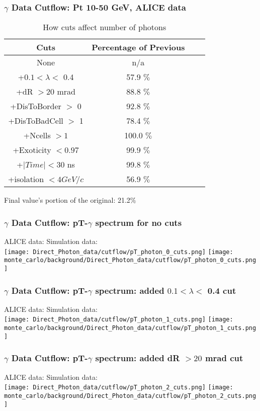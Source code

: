 \documentclass{beamer}
\begin{document}
\frame 
{ 
\frametitle{$\gamma$ Data Cutflow: Pt 10-50 GeV, ALICE data} 
\begin{table} 
\caption{How cuts affect number of photons} 
\centering 
\begin{tabular}{c c c c} 
\hline\hline 
Cuts & Percentage of Previous\\ [0.5ex] 
\hline
None & n/a\\
+$0.1 < \lambda <$ 0.4 & 57.9 $\%$ \\
+dR $> 20$ mrad & 88.8 $\%$ \\
+DisToBorder $>$ 0 & 92.8 $\%$ \\
+DisToBadCell $>$ 1 & 78.4 $\%$ \\
+Ncells $> 1$ & 100.0 $\%$ \\
+Exoticity $< 0.97$ & 99.9 $\%$ \\
+$|Time| < 30$ ns & 99.8 $\%$ \\
+isolation $< 4 GeV/c$ & 56.9 $\%$ \\
[1ex] 
\hline 
\end{tabular} 
\label{table:nonlin} 
\end{table} 
 Final value's portion of the original: 21.2\%
 } 

\frame
{
	\frametitle{$\gamma$ Data Cutflow: pT-$\gamma$ spectrum for no cuts}
	\noindent\hspace{1.5 cm}ALICE data: 
	\noindent\hspace{3.0 cm} Simulation data:\\
	\texttt{[image: Direct\_Photon\_data/cutflow/pT\_photon\_0\_cuts.png]}
	\texttt{[image: monte\_carlo/background/Direct\_Photon\_data/cutflow/pT\_photon\_0\_cuts.png]}
}

\frame
{
	\frametitle{$\gamma$ Data Cutflow: pT-$\gamma$ spectrum: added $0.1 < \lambda <$ 0.4 cut}
	\noindent\hspace{1.5 cm}ALICE data: 
	\noindent\hspace{3.0 cm} Simulation data:\\
	\texttt{[image: Direct\_Photon\_data/cutflow/pT\_photon\_1\_cuts.png]}
	\texttt{[image: monte\_carlo/background/Direct\_Photon\_data/cutflow/pT\_photon\_1\_cuts.png]}
}

\frame
{
	\frametitle{$\gamma$ Data Cutflow: pT-$\gamma$ spectrum: added dR $> 20$ mrad cut}
	\noindent\hspace{1.5 cm}ALICE data: 
	\noindent\hspace{3.0 cm} Simulation data:\\
	\texttt{[image: Direct\_Photon\_data/cutflow/pT\_photon\_2\_cuts.png]}
	\texttt{[image: monte\_carlo/background/Direct\_Photon\_data/cutflow/pT\_photon\_2\_cuts.png]}
}
\end{document}
